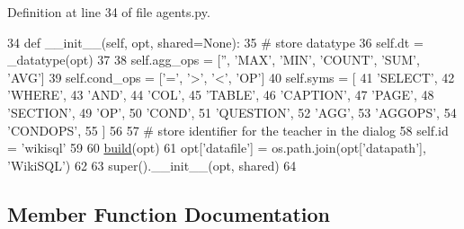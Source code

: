 Definition at line 34 of file agents.\+py.


\begin{DoxyCode}
34     \textcolor{keyword}{def }\_\_init\_\_(self, opt, shared=None):
35         \textcolor{comment}{# store datatype}
36         self.dt = \_datatype(opt)
37 
38         self.agg\_ops = [\textcolor{stringliteral}{''}, \textcolor{stringliteral}{'MAX'}, \textcolor{stringliteral}{'MIN'}, \textcolor{stringliteral}{'COUNT'}, \textcolor{stringliteral}{'SUM'}, \textcolor{stringliteral}{'AVG'}]
39         self.cond\_ops = [\textcolor{stringliteral}{'='}, \textcolor{stringliteral}{'>'}, \textcolor{stringliteral}{'<'}, \textcolor{stringliteral}{'OP'}]
40         self.syms = [
41             \textcolor{stringliteral}{'SELECT'},
42             \textcolor{stringliteral}{'WHERE'},
43             \textcolor{stringliteral}{'AND'},
44             \textcolor{stringliteral}{'COL'},
45             \textcolor{stringliteral}{'TABLE'},
46             \textcolor{stringliteral}{'CAPTION'},
47             \textcolor{stringliteral}{'PAGE'},
48             \textcolor{stringliteral}{'SECTION'},
49             \textcolor{stringliteral}{'OP'},
50             \textcolor{stringliteral}{'COND'},
51             \textcolor{stringliteral}{'QUESTION'},
52             \textcolor{stringliteral}{'AGG'},
53             \textcolor{stringliteral}{'AGGOPS'},
54             \textcolor{stringliteral}{'CONDOPS'},
55         ]
56 
57         \textcolor{comment}{# store identifier for the teacher in the dialog}
58         self.id = \textcolor{stringliteral}{'wikisql'}
59 
60         \hyperlink{namespaceparlai_1_1mturk_1_1tasks_1_1talkthewalk_1_1download_a8c0fbb9b6dfe127cb8c1bd6e7c4e33fd}{build}(opt)
61         opt[\textcolor{stringliteral}{'datafile'}] = os.path.join(opt[\textcolor{stringliteral}{'datapath'}], \textcolor{stringliteral}{'WikiSQL'})
62 
63         super().\_\_init\_\_(opt, shared)
64 
\end{DoxyCode}


\subsection{Member Function Documentation}
\mbox{\label{classparlai_1_1tasks_1_1wikisql_1_1agents_1_1WikiSQLTeacher_ac640a241c4e9ac29feddd1ecbbb35509}} 
